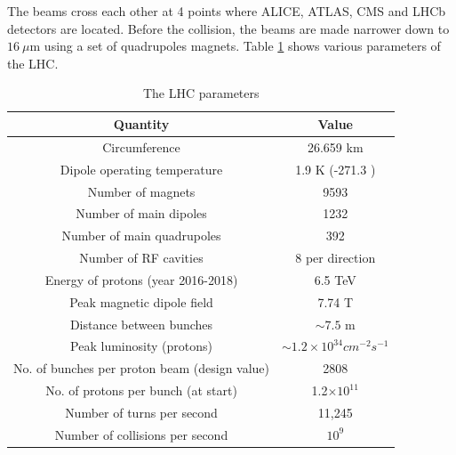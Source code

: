 The beams cross each other at 4 points where ALICE, ATLAS, CMS and LHCb detectors are located. Before the collision, the beams are made 
narrower down to $16\ \mu$m using a set of quadrupoles magnets. Table \ref{tab:LHCparms} shows various parameters of the LHC.
\begin{table}[h!]
\centering
\caption[The LHC parameters]{The LHC parameters \cite{LHCfaq}}
\label{tab:LHCparms}
\begin{tabular}{|c|c|}
\hline  
Quantity			&	Value  \\ \hline
Circumference  &	26.659 km  \\ 
Dipole operating temperature	&	1.9 K (-271.3 \textcelsius) \\
Number of magnets	&	9593 \\
Number of main dipoles	&	1232 \\
Number of main quadrupoles	&	392 \\
Number of RF cavities	&	8 per direction \\
Energy of protons (year 2016-2018)	&	6.5 TeV\\
Peak magnetic dipole field &	7.74 T\\
Distance between bunches	&	$\sim 7.5$ m\\
Peak luminosity (protons)	&	$\sim 1.2\times 10^{34} cm^{-2}s^{-1}$\\
No. of bunches per proton beam (design value)	&	2808\\
No. of protons per bunch (at start)	&	1.2$\times10^{11}$\\
Number of turns per second &	11,245 \\
Number of collisions per second	&	$10^9$\\\hline 
\end{tabular} 
\end{table}
